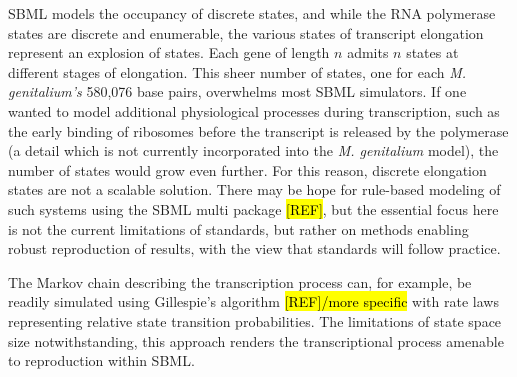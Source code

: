 \documentclass[journal,transmag]{IEEEtran}
\begin{document}
SBML models the occupancy of discrete states, and while the RNA polymerase states
are discrete and enumerable, the various states of transcript elongation
represent an explosion of states. Each gene of length $n$ admits $n$ states
at different stages of elongation.
This sheer number of states, one for each \textit{M. genitalium's}
580,076 base pairs, overwhelms most SBML
simulators.
If one wanted to model additional physiological processes during transcription,
such as the early binding of ribosomes before the transcript is released
by the polymerase (a detail which is not currently incorporated into the
\textit{M. genitalium} model), the number of states would grow even further.
For this reason, discrete elongation states are not a scalable solution.
There may be hope for rule-based modeling of such systems using the SBML
multi package \hl{[REF]}, but the essential focus here is not the current limitations
of standards, but rather on methods enabling robust reproduction of results,
with the view that standards will follow practice.

The Markov chain describing the transcription process can, for example,
be readily simulated using Gillespie's algorithm \hl{[REF]/more specific}
with rate laws representing relative state transition probabilities.
The limitations of state space size notwithstanding, this approach renders
the transcriptional process amenable to reproduction within SBML.




%
%
\end{document}

